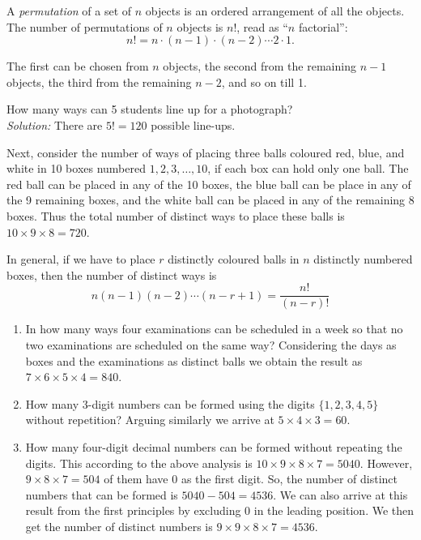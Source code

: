 \begin{definition}
A \emph{permutation} of a set of $n$ objects is an ordered arrangement
of all the objects. The number of permutations of $n$ objects is $n!$,
read as ``$n$ factorial'':
\[
n! = n \cdot (n-1) \cdot (n-2) \cdots 2 \cdot 1.
\]
\end{definition}

The first  can be chosen from $n$ objects, the second from the remaining $n-1$ objects, the third from the remaining $n-2$, and so on till 1.

\begin{example}
How many ways can 5 students line up for a photograph? \\
\emph{Solution:} There are $5! = 120$ possible line-ups.
\end{example}

Next, consider the number of ways of placing three balls coloured red, blue, and white in 10 boxes numbered $1,2,3,\ldots,10$, if each box can hold only one ball. The red ball can be placed in any of the 10 boxes, the blue ball can be place in any of the 9 remaining boxes, and the white ball can be placed in any of the remaining 8 boxes. Thus the total number of distinct ways to place these balls is $10 \times 9 \times 8 = 720$.

In general, if we have to place $r$ distinctly coloured balls in $n$ distinctly numbered boxes, then the number of distinct ways is
\[
n(n-1)(n-2) \cdots (n-r+1) =  \frac{n!}{(n-r)!}
\]

\begin{example}
\begin{enumerate}
\item In how many ways four examinations can be scheduled in a week so that no two examinations are scheduled on the same way? Considering the days as boxes and the examinations as distinct balls we obtain
the result as $7 \times 6 \times 5 \times 4 = 840$.
\item How many 3-digit numbers can be formed using the digits $\{1,2,3,4,5\}$ without repetition? Arguing similarly we arrive at  $5 \times 4 \times 3 = 60$.
\item How many four-digit decimal numbers can be formed without repeating the digits. This according to the above analysis is $10 \times 9 \times 8 \times 7 = 5040$. However, $9 \times 8 \times 7 = 504$ of them have 0 as the first digit. So, the number of distinct numbers that can be formed is $5040 - 504 = 4536$. We can also arrive at this result from the first principles by excluding 0 in the leading position. We then get the number of distinct numbers is $9 \times 9 \times 8 \times 7 = 4536$.
\end{enumerate}
\end{example}

